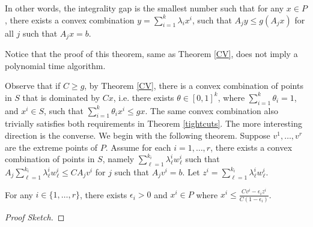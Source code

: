 \documentclass[runningheads]{llncs}
\begin{document}
In other words, the integrality gap is the smallest number such that for any $x\in P$, there exists a convex combination $y=\sum_{i=1}^{k}\lambda_ix^i$, such that $A_jy\leq g(A_jx)$ for all $j$ such that $A_jx=b$. 

Notice that the proof of this theorem, same as Theorem \ref{CV}, does not imply a polynomial time algorithm.

Observe that if $C\geq g$, by Theorem \ref{CV}, there is a convex combination of points in $S$ that is dominated by $Cx$, i.e. there exists $\theta\in [0,1]^{k}$, where $\sum_{i=1}^{k}\theta_i=1$, and $x^i\in S$, such that $\sum_{i=1}^{k}\theta_ix^i\leq gx$. The same convex combination also trivially satisfies both requirements in Theorem \ref{tightcuts}. The more interesting direction is the converse. We begin with the following theorem. Suppose $v^1,\ldots,v^r$ are the extreme points of $P$. Assume for each $i=1,\ldots,r$, there exists a convex combination of points in $S$, namely $\sum_{\ell=1}^{k_i} \lambda^i_\ell w^i_\ell$ such that $A_j \sum_{\ell=1}^{k_i} \lambda^i_\ell w^i_\ell \leq CA_jv^i$ for $j$ such that $A_jv^i = b$. Let $z^i = \sum_{\ell=1}^{k_i} \lambda^i_\ell w^i_\ell$.
\begin{lemma}\label{epsilon}
	For any  $i\in\{1,\ldots,r\}$, there exists $\epsilon_i >0$ and ${x^i}\in P$ where ${x^i}\leq \frac{Cv^i-\epsilon_i z^i}{C(1-\epsilon_i)}$.
\end{lemma}
\begin{proof}[Proof Sketch]
	
	\end{proof}
\end{document}
